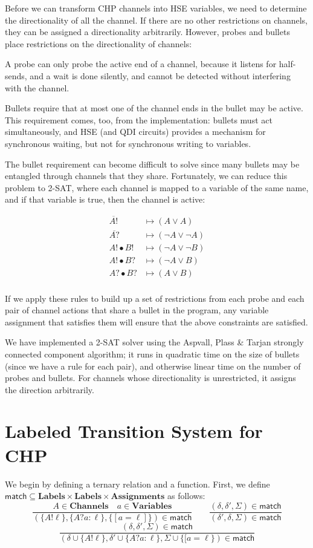 \documentclass[times, 10pt]{article}
\begin{document}
Before we can transform CHP channels into HSE variables, we need to determine
the directionality of all the channel.  If there are no other restrictions on
channels, they can be assigned a directionality arbitrarily.  However, probes
and bullets place restrictions on the directionality of channels:

A probe can only probe the active end of a channel, because it listens for
half-sends, and a wait is done silently, and cannot be detected without
interfering with the channel.

Bullets require that at most one of the channel ends in the bullet may be
active.  This requirement comes, too, from the implementation:  bullets must act
simultaneously, and HSE (and QDI circuits) provides a mechanism for synchronous
waiting, but not for synchronous writing to variables.

The bullet requirement can become difficult to solve since many bullets may be
entangled through channels that they share.  Fortunately, we can reduce this
problem to 2-SAT, where each channel is mapped to a variable of the same name,
and if that variable is true, then the channel is active:

\begin{align*}
\overline{A!} & \mapsto (A \lor A) \\
\overline{A?} & \mapsto (\lnot A \lor \lnot A) \\
A! \bullet B! & \mapsto (\lnot A \lor \lnot B) \\
A! \bullet B? & \mapsto (\lnot A \lor B) \\
A? \bullet B? & \mapsto (A \lor B) \\
\end{align*}

If we apply these rules to build up a set of restrictions from each probe and
each pair of channel actions that share a bullet in the program, any variable
assignment that satisfies them will ensure that the above constraints are
satisfied.

We have implemented a 2-SAT solver using the Aspvall, Plass \& Tarjan strongly
connected component algorithm; it runs in quadratic time on the size of bullets
(since we have a rule for each pair), and otherwise linear time on the number of
probes and bullets.  For channels whose directionality is unrestricted, it
assigns the direction arbitrarily.

\section{Labeled Transition System for CHP}
We begin by defining a ternary relation and a function. First, we define
$\mathsf{match} \subseteq \mathbf{Labels} \times \mathbf{Labels} \times
\mathbf{Assignments}$ as follows:
$$
    \frac{A \in \mathbf{Channels} \quad a \in \mathbf{Variables}}{(\{A!\ell\}, \{A?a : \ell\}, \{[a = \ell]\}) \in \mathsf{match}} \qquad
    \frac{(\delta, \delta', \Sigma) \in \mathsf{match}}{(\delta', \delta, \Sigma) \in \mathsf{match}} $$$$
    \frac{(\delta, \delta', \Sigma) \in \mathsf{match}}{(\delta \cup \{A!\ell\}, \delta' \cup \{A?a : \ell\}, \Sigma \cup \{[a = \ell\}) \in \mathsf{match}}
$$
\end{document}
